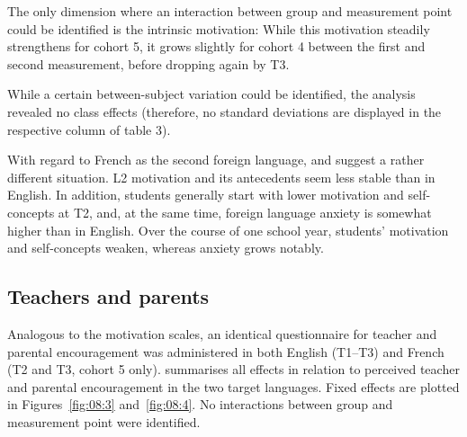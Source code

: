 \documentclass[output=paper]{langsci/langscibook}
\begin{document}
\begin{sloppypar}
The only dimension where an interaction between group and measurement point could be identified is the intrinsic motivation: While this motivation steadily strengthens for cohort 5, it grows slightly for cohort 4 between the first and second measurement, before dropping again by T3. 
\end{sloppypar}

While a certain between-subject variation could be identified, the analysis revealed no class effects (therefore, no standard deviations are displayed in the respective column of table 3).

With regard to French as the second foreign language,   and   suggest a rather different situation. L2 motivation and its antecedents seem less stable than in English. In addition, students generally start with lower motivation and self-concepts at T2, and, at the same time, foreign language anxiety is somewhat higher than in English. Over the course of one school year, students’ motivation and self-concepts weaken, whereas anxiety grows notably.

\subsection{Teachers and parents}

Analogous to the motivation scales, an identical questionnaire for teacher and parental encouragement was administered in both English (T1--T3) and French (T2 and T3, cohort 5 only).   summarises all effects in relation to perceived teacher and parental encouragement in the two target languages. Fixed effects are plotted in Figures~\ref{fig:08:3}  and~\ref{fig:08:4}. No interactions between group and measurement point were identified.


\begin{table}
\caption{Fixed and random effects for perceived teacher and parental encouragement\label{tab:08:4}. EN: English, FR: French, TE: Teacher encouragement, PE: Parental encouragement, Int: Intercept.}
\end{table}
\end{document}
